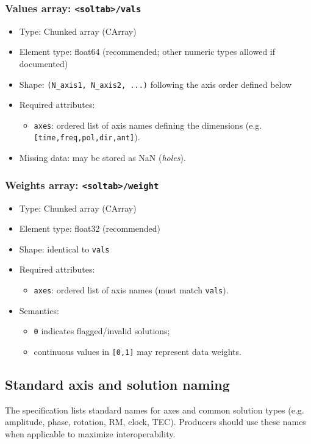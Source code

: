 \documentclass[a4paper,10pt,bibtotoc]{scrartcl}
\begin{document}
\subsubsection*{Values array: \texttt{<soltab>/vals}}
\begin{itemize}
  \item Type: Chunked array (CArray)
  \item Element type: float64 (recommended; other numeric types allowed if documented)
  \item Shape: \texttt{(N\_axis1, N\_axis2, ...)} following the axis order defined below
  \item Required attributes:
  \begin{itemize}
    \item \texttt{axes}: ordered list of axis names defining the dimensions (e.g. \texttt{[time,freq,pol,dir,ant]}).
  \end{itemize}
  \item Missing data: may be stored as NaN (\emph{holes}).
\end{itemize}

\subsubsection*{Weights array: \texttt{<soltab>/weight}}
\begin{itemize}
  \item Type: Chunked array (CArray)
  \item Element type: float32 (recommended)
  \item Shape: identical to \texttt{vals}
  \item Required attributes:
  \begin{itemize}
    \item \texttt{axes}: ordered list of axis names (must match \texttt{vals}). 
  \end{itemize}
  \item Semantics:
  \begin{itemize}
    \item \texttt{0} indicates flagged/invalid solutions;
    \item continuous values in \texttt{[0,1]} may represent data weights. 
  \end{itemize}
\end{itemize}

\subsection{Standard axis and solution naming}
The specification lists standard names for axes and common solution types (e.g. amplitude, phase,
rotation, RM, clock, TEC). Producers should use these names when applicable to maximize
interoperability. 
\end{document}
